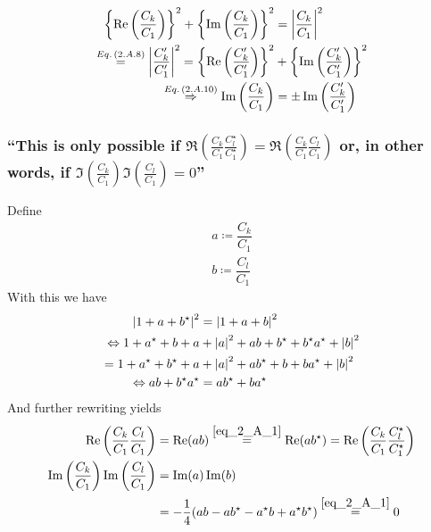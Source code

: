 \subsubsection{ }
\begin{align*} 
	\left\lbrace\Re\left(\dfrac{C_k}{C_1}\right)\right\rbrace^2+\left\lbrace\Im\left(\dfrac{C_k}{C_1}\right)\right\rbrace^2&=\abs{\dfrac{C_k}{C_1}}^2\\
	\overset{Eq.\,({2.A.8})}{=}\abs{\dfrac{C_k^\prime}{C_1^\prime}}^2=\left\lbrace\Re\left(\dfrac{C_k^\prime}{C_1^\prime}\right)\right\rbrace^2&+\left\lbrace\Im\left(\dfrac{C_k^\prime}{C_1^\prime}\right)\right\rbrace^2\\
	\overset{Eq.\,({2.A.10})}{\Rightarrow} \Im\left(\dfrac{C_k}{C_1}\right)&=\pm\Im\left(\dfrac{C_k^\prime}{C_1^\prime}\right)
\end{align*}

\subsubsection{\enquote{This is only possible if $\Re\left(\frac{C_k}{C_1}\frac{C_l^\star}{C_1^\star}\right)=\Re\left(\frac{C_k}{C_1}\frac{C_l}{C_1}\right)$ or, in other words, if $\Im\left(\frac{C_k}{C_1}\right)\Im\left(\frac{C_l}{C_1}\right)=0$} }

Define 
\begin{align*} 
	a\coloneqq \dfrac{C_k}{C_1}\\
	b\coloneqq \dfrac{C_l}{C_1}
\end{align*}
With this we have
\begin{align} 
	\abs{1+a+b^\star}^2&=\abs{1+a+b}^2\\
	\Leftrightarrow 1 + a^\star+b+a&+\abs{a}^2+a b+b^\star+b^\star a^\star+\abs{b}^2\\
	=1 + a^\star+b^\star+a&+\abs{a}^2+a b^\star+b+b a^\star+\abs{b}^2\\
	\Leftrightarrow a b+b^\star a^\star&=a b^\star+b a^\star \label{eq_2_A_1}
\end{align}
And further rewriting yields
\begin{align*} 
	\Re\left(\dfrac{C_k}{C_1}\dfrac{C_l}{C_1}\right)&=\Re(a b)\overset{\ref{eq_2_A_1}}{=}\Re(a b^\star)=\Re\left(\dfrac{C_k}{C_1}\dfrac{C_l^\star}{C_1^\star}\right)\\
	\Im\left(\dfrac{C_k}{C_1}\right)\Im\left(\dfrac{C_l}{C_1}\right)&=\Im(a)\Im(b)\\
	&=-\dfrac{1}{4}(ab - a b^\star-a^\star b + a^\star b^\star)\overset{\ref{eq_2_A_1}}{=}0
\end{align*}

